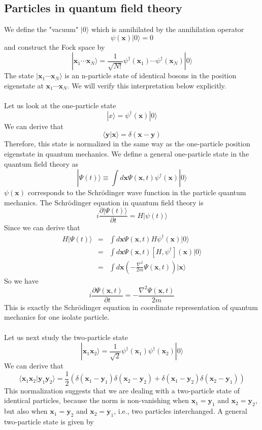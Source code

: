 \subsection{Particles in quantum field theory}
We define the "vacuum" $|0\rangle$ which is annihilated by the annihilation operator
\[\psi(\bm{x})|0\rangle = 0\]
and construct the Fock space by
\[|\bm{x}_1\cdots\bm{x}_N\rangle = \frac{1}{\sqrt{N!}}\psi^{\dagger}(\bm{x}_1)\cdots\psi^{\dagger}(\bm{x}_N)|0\rangle \]
The state $|\bm{x}_1\cdots\bm{x}_N\rangle$ is an n-particle state of identical bosons in the position eigenstate
at $\bm{x}_1\cdots\bm{x}_N$. We will verify this interpretation below explicitly.\\ \\
Let us look at the one-particle state
\[|x\rangle = \psi^{\dagger}(\bm{x})|0\rangle\]
We can derive that
\[\langle \bm{y}| \bm{x}\rangle = \delta(\bm{x}-\bm{y})\]
Therefore, this state is normalized in the same way as the one-particle position eigenstate in quantum mechanics.
We define a general one-particle state in the quantum field theory as
\[|\Psi(t)\rangle \equiv \int d\bm{x} \Psi(\bm{x},t)\psi^{\dagger}(\bm{x})|0\rangle\]
$\psi(\bm{x})$ corresponds to the Schrödinger wave function in the particle quantum mechanics. The Schrödinger equation in quantum field theory is
\[i\frac{\partial |\Psi(t)\rangle}{\partial t} = H|\psi(t)\rangle\]
Since we can derive that
\begin{eqnarray}
H|\Psi(t)\rangle &=& \int d\bm{x} \Psi(\bm{x},t) H\psi^{\dagger}(\bm{x})|0\rangle \nonumber \\
&=& \int d\bm{x} \Psi(\bm{x},t) [H,\psi^{\dagger}](\bm{x})|0\rangle \nonumber \\
&=& \int d\bm{x} \left( -\frac{\nabla^2}{2m}\Psi(\bm{x},t) \right)|\bm{x}\rangle \nonumber
\end{eqnarray}
So we have
\[i\frac{\partial \Psi(\bm{x},t)}{\partial t} = -\frac{\nabla^2\Psi(\bm{x},t)}{2m}\]
This is exactly the Schrödinger equation in coordinate representation of quantum mechanics for one isolate particle.\\ \\
Let us next study the two-particle state
\[|\bm{x}_1\bm{x}_2\rangle = \frac{1}{\sqrt{2}} \psi^{\dagger}(\bm{x}_1)\psi^{\dagger}(\bm{x}_2)|0\rangle\]
We can derive that
\[\langle \bm{x}_1\bm{x}_2 |\bm{y}_1\bm{y}_2\rangle = \frac{1}{2} \left( \delta(\bm{x}_1-\bm{y}_1)\delta(\bm{x}_2-\bm{y}_2) + \delta(\bm{x}_1-\bm{y}_2)\delta(\bm{x}_2-\bm{y}_1)\right)\]
This normalization suggests that we are dealing with a two-particle state of identical particles, because the norm is non-vanishing when $\bm{x}_1 = \bm{y}_1$ and $\bm{x}_2 = \bm{y}_2$, but also when $\bm{x}_1 = \bm{y}_2$ and $\bm{x}_2 = \bm{y}_1$, i.e., two particles interchanged. A general two-particle state is given by
